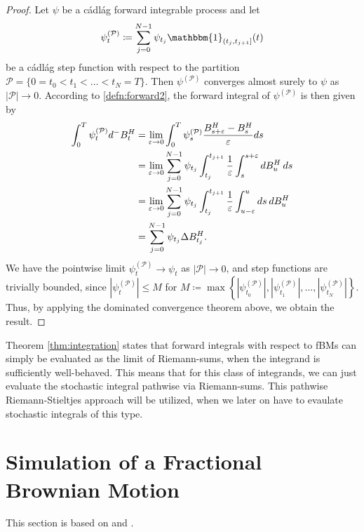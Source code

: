 \begin{proof}
    Let $\psi$ be a cádlág forward integrable process and let
    \begin{equation}
        \psi^{(\mathcal{P})}_{t}\coloneqq \sum_{j=0}^{N-1}\psi_{t_{j}}\mathbbm{1}_{(t_{j},t_{j+1}]}(t)
    \end{equation}
    be a cádlág step function with respect to the partition $\mathcal{P}=\{0=t_{0}<t_{1}<\dots <t_{N}=T\}$. Then $\psi^{(\mathcal{P})}$ converges almost surely to $\psi$ as $|\mathcal{P}|\to 0$. According to \eqref{defn:forward2}, the forward integral of $\psi^{(\mathcal{P})}$ is then given by
    \begin{align}
        \int_{0}^{T}\psi^{(\mathcal{P})}_{t}d^{-}B^{H}_{t}&=\lim_{\varepsilon\to 0}\int_{0}^{T}\psi^{(\mathcal{P})}_{s}\frac{B^{H}_{s+\varepsilon}-B_{s}^{H}}{\varepsilon}ds\\
        &= \lim_{\varepsilon\to 0}\sum_{j=0}^{N-1}\psi_{t_{j}}\int_{t_{j}}^{t_{j+1}}\frac{1}{\varepsilon}\int_{s}^{s+\varepsilon}dB_{u}^{H}\hspace{2 pt}ds\\
        &= \lim_{\varepsilon\to 0}\sum_{j=0}^{N-1}\psi_{t_{j}}\int_{t_{j}}^{t_{j+1}}\frac{1}{\varepsilon}\int_{u-\varepsilon}^{u}ds\hspace{2 pt}dB_{u}^{H}\\
        &= \sum_{j=0}^{N-1}\psi_{t_{j}}\Delta B_{t_{j}}^{H}.
    \end{align}
We have the pointwise limit $\psi^{(\mathcal{P})}_{t}\to\psi_{t}$ as $|\mathcal{P}|\to 0$, and step functions are trivially bounded, since $|\psi^{(\mathcal{P})}_{t}|\leq M$ for $M\coloneqq \max\left\{|\psi^{(\mathcal{P})}_{t_{0}}|, |\psi^{(\mathcal{P})}_{t_{1}}|,\dots,|\psi^{(\mathcal{P})}_{t_{N}}|\right\}$. Thus, by applying the dominated convergence theorem above, we obtain the result.
\end{proof}
Theorem \ref{thm:integration} states that forward integrals with respect to fBMs can simply be evaluated as the limit of Riemann-sums, when the integrand is sufficiently well-behaved. This means that for this class of integrands, we can just evaluate the stochastic integral pathwise via Riemann-sums. This pathwise Riemann-Stieltjes approach will be utilized, when we later on have to evaulate stochastic integrals of this type. 
\section{Simulation of a Fractional Brownian Motion}\label{sec:simu}
This section is based on \cite{simfBM} and \cite{simfBMappendix}.

